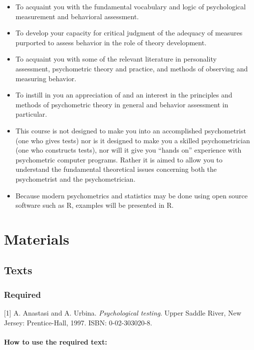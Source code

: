 \begin{itemize}
\tightlist
\item
  To acquaint you with the fundamental vocabulary and logic of psychological measurement and behavioral assessment.
\item
  To develop your capacity for critical judgment of the adequacy of measures purported to assess behavior in the role of theory development.
\item
  To acquaint you with some of the relevant literature in personality assessment, psychometric theory and practice, and methods of observing and measuring behavior.
\item
  To instill in you an appreciation of and an interest in the principles and methods of psychometric theory in general and behavior assessment in particular.
\item
  This course is not designed to make you into an accomplished psychometrist (one who gives tests) nor is it designed to make you a skilled psychometrician (one who constructs tests), nor will it give you ``hands on'' experience with psychometric computer programs. Rather it is aimed to allow you to understand the fundamental theoretical issues concerning both the psychometrist and the psychometrician.
\item
  Because modern psychometrics and statistics may be done using open source software such as R, examples will be presented in R.
\end{itemize}

\hypertarget{materials-1}{%
\section*{Materials}\label{materials-1}}


\hypertarget{texts}{%
\subsection*{Texts}\label{texts}}


\hypertarget{required}{%
\subsubsection*{Required}\label{required}}


{[}1{]} A. Anastasi and A. Urbina. \emph{Psychological testing}. Upper Saddle
River, New Jersey: Prentice-Hall, 1997. ISBN: 0-02-303020-8.

\hypertarget{how-to-use-the-required-text}{%
\paragraph*{How to use the required text:}\label{how-to-use-the-required-text}}

